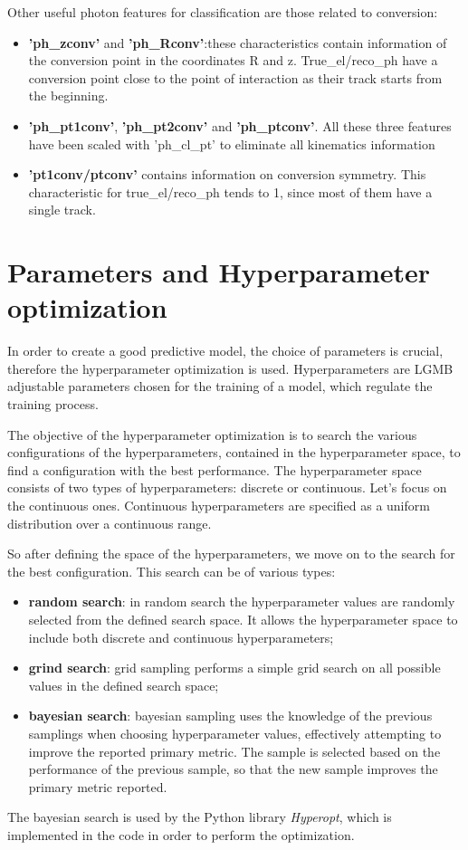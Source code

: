 \documentclass[a4paper, oneside]{book}
\begin{document}
				Other useful photon features for classification are those related to conversion:
				\begin{itemize}
					\item \textbf{'ph\_zconv'} and \textbf{'ph\_Rconv'}:these characteristics contain information of the conversion point in the coordinates R and z. True\_el/reco\_ph have a conversion point close to the point of interaction as their track starts from the beginning.
					\item \textbf{'ph\_pt1conv'}, \textbf{'ph\_pt2conv'} and \textbf{'ph\_ptconv'}. All these three features have been scaled with 'ph\_cl\_pt' to eliminate all kinematics information 
					\item \textbf{'pt1conv/ptconv'} contains information on conversion symmetry. This characteristic for true\_el/reco\_ph tends to 1, since most of them have a single track.
				\end{itemize}
				
			\section{Parameters and Hyperparameter optimization}	
			In order to create a good predictive model, the choice of parameters is crucial, therefore the hyperparameter optimization is used. Hyperparameters are LGMB adjustable parameters chosen for the training of a model, which regulate the training process. 
			
			The objective of the hyperparameter optimization is to search the various configurations of the hyperparameters, contained in the hyperparameter space, to find a configuration with the best performance. The hyperparameter space consists of two types of hyperparameters: discrete or continuous. Let's focus on the continuous ones.
			Continuous hyperparameters are specified as a uniform distribution   over a continuous range. 
			
			So after defining the space of the hyperparameters, we move on to the search for the best configuration. This search can be of various types:
			\begin{itemize}
				\item \textbf{random search}: in random search the hyperparameter values are randomly selected from the defined search space. It allows the  hyperparameter space to include both discrete and continuous hyperparameters;
				\item \textbf{grind search}: grid sampling performs a simple grid search on all possible values in the defined search space;
				\item \textbf{bayesian search}: bayesian sampling uses the knowledge of the previous samplings when choosing hyperparameter values, effectively attempting to improve the reported primary metric. The sample is selected based on the performance of the previous sample, so that the new sample improves the primary metric reported. 
			\end{itemize}
			The bayesian search is used by the Python library \textit{Hyperopt}, which is implemented in the code in order to perform the optimization.
			
\end{document}
